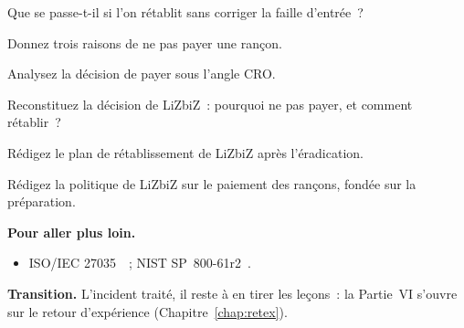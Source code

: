 \begin{boxexo}[title={\ding{45}\quad Exercice~18.5. Faille d'entrée \niveaumoyen}]
Que se passe-t-il si l'on rétablit sans corriger la faille d'entrée~?
\end{boxexo}

\begin{boxexo}[title={\ding{45}\quad Exercice~18.6. Payer \niveaumoyen}]
Donnez trois raisons de ne pas payer une rançon.
\end{boxexo}

\begin{boxexo}[title={\ding{45}\quad Exercice~18.7. CRO \niveaumoyen}]
Analysez la décision de payer sous l'angle CRO.
\end{boxexo}

\begin{boxexo}[title={\ding{45}\quad Exercice~18.8. MAYO \niveaumoyen}]
Reconstituez la décision de LiZbiZ~: pourquoi ne pas payer, et comment
rétablir~?
\end{boxexo}

\begin{boxexo}[title={\ding{45}\quad Exercice~18.9. Plan de rétablissement \niveauexpert}]
Rédigez le plan de rétablissement de LiZbiZ après l'éradication.
\end{boxexo}

\begin{boxexo}[title={\ding{45}\quad Exercice~18.10. Politique rançongiciel \niveauexpert}]
Rédigez la politique de LiZbiZ sur le paiement des rançons, fondée sur la
préparation.
\end{boxexo}

\bigskip

\begin{boxinfo}
\textbf{Pour aller plus loin.}
\begin{itemize}
    \item ISO/IEC 27035~\cite{iso27035}~; NIST SP~800-61r2~\cite{nist80061r2}.
\end{itemize}
\end{boxinfo}

\begin{boxinfo}
\textbf{Transition.} L'incident traité, il reste à en tirer les leçons~: la
Partie~VI s'ouvre sur le retour d'expérience
(Chapitre~\ref{chap:retex}).
\end{boxinfo}
